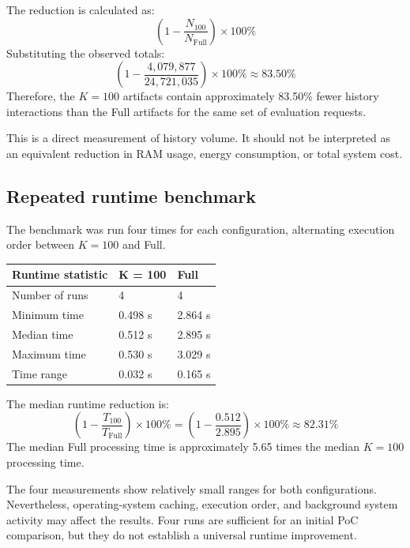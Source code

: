 \documentclass[11pt,a4paper]{article}
\begin{document}
The reduction is calculated as:
\begin{equation}
\left( 1 - \frac{N_{100}}{N_{\mathrm{Full}}} \right) \times 100\%
\end{equation}
Substituting the observed totals:
\begin{equation}
\left( 1 - \frac{4,079,877}{24,721,035} \right) \times 100\% \approx 83.50\%
\end{equation}
Therefore, the $K = 100$ artifacts contain approximately 83.50\% fewer history interactions than the Full artifacts for the same set of evaluation requests.

This is a direct measurement of history volume. It should not be interpreted as an equivalent reduction in RAM usage, energy consumption, or total system cost.

\subsection{Repeated runtime benchmark}
The benchmark was run four times for each configuration, alternating execution order between $K = 100$ and Full.
\begin{table}[htbp]
\centering
\begin{tabular}{lll}
\toprule
\textbf{Runtime statistic} & \textbf{K = 100} & \textbf{Full} \\
\midrule
Number of runs & 4 & 4 \\
Minimum time & 0.498 s & 2.864 s \\
Median time & 0.512 s & 2.895 s \\
Maximum time & 0.530 s & 3.029 s \\
Time range & 0.032 s & 0.165 s \\
\bottomrule
\end{tabular}
\end{table}

The median runtime reduction is:
\begin{equation}
\left( 1 - \frac{T_{100}}{T_{\mathrm{Full}}} \right) \times 100\% = \left( 1 - \frac{0.512}{2.895} \right) \times 100\% \approx 82.31\%
\end{equation}
The median Full processing time is approximately 5.65 times the median $K = 100$ processing time.

The four measurements show relatively small ranges for both configurations. Nevertheless, operating-system caching, execution order, and background system activity may affect the results. Four runs are sufficient for an initial PoC comparison, but they do not establish a universal runtime improvement.
\end{document}

